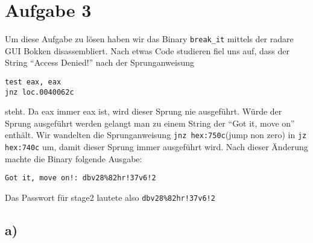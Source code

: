 \documentclass[10pt,a4paper]{article}
\begin{document}
\section*{Aufgabe 3}
Um diese Aufgabe zu lösen haben wir das Binary \texttt{break\_it} mittels der radare GUI Bokken disassembliert. Nach etwas Code studieren fiel uns auf, dass der String "`Access Denied!"' nach der Sprunganweisung 
\begin{verbatim}
test eax, eax
jnz loc.0040062c
\end{verbatim}  
steht. Da eax immer eax ist, wird dieser Sprung nie ausgeführt. Würde der Sprung ausgeführt werden gelangt man zu einem String der "`Got it, move on"' enthält. Wir wandelten die Sprunganweisung \texttt{jnz hex:750c}(jump non zero) in \texttt{jz hex:740c} um, damit dieser Sprung immer ausgeführt wird.
Nach dieser Änderung machte die Binary folgende Ausgabe:
\begin{verbatim}
Got it, move on!: dbv28%82hr!37v6!2
\end{verbatim}
Das Passwort für stage2 lautete also \texttt{dbv28\%82hr!37v6!2}

\subsection*{a)}
\end{document}
